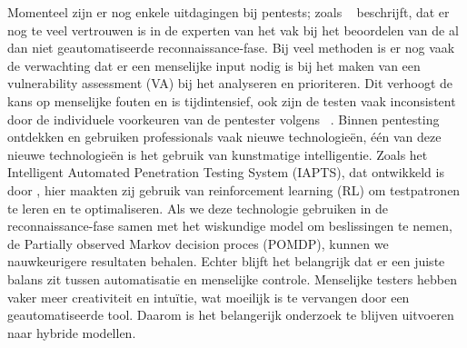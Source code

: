 Momenteel zijn er nog enkele uitdagingen bij pentests; zoals ~\textcite{Fugkeaw} beschrijft, dat er nog te veel vertrouwen is  
in de experten van het vak bij het beoordelen van de al dan niet geautomatiseerde reconnaissance-fase. Bij veel methoden is er nog vaak de verwachting dat er een menselijke input nodig is bij het maken van een vulnerability assessment (VA) bij het analyseren en prioriteren. Dit verhoogt de kans op menselijke fouten en is tijdintensief, ook zijn de testen vaak inconsistent door de individuele voorkeuren van de pentester volgens ~\textcite{Ghanem}.
Binnen pentesting ontdekken en gebruiken professionals vaak nieuwe technologieën, één van deze nieuwe technologieën is het gebruik van kunstmatige intelligentie. Zoals het Intelligent Automated Penetration Testing System (IAPTS), dat ontwikkeld is door \textcite{Ghanem}, hier maakten zij gebruik van reinforcement learning (RL) om testpatronen te leren en te optimaliseren. Als we deze technologie gebruiken in de reconnaissance-fase samen met het wiskundige model om beslissingen te nemen, de Partially observed Markov decision proces (POMDP), kunnen we nauwkeurigere resultaten behalen. Echter blijft het belangrijk dat er een juiste balans zit tussen automatisatie en menselijke controle. Menselijke testers hebben vaker meer creativiteit en intuïtie, wat moeilijk is te vervangen door een geautomatiseerde tool. Daarom is het belangerijk onderzoek te blijven uitvoeren naar hybride modellen.  








